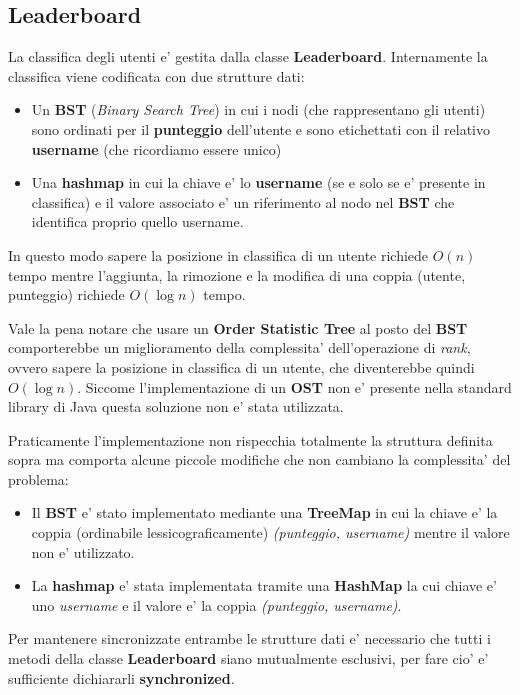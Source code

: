 \subsection{Leaderboard}

La classifica degli utenti e' gestita dalla classe \textbf{Leaderboard}. Internamente la classifica viene codificata con due strutture dati:
\begin{itemize}
	\item Un \textbf{BST} (\emph{Binary Search Tree}) in cui i nodi (che rappresentano gli utenti) sono ordinati per il \textbf{punteggio} dell'utente e sono etichettati con il relativo \textbf{username} (che ricordiamo essere unico)
	\item Una \textbf{hashmap} in cui la chiave e' lo \textbf{username} (se e solo se e' presente in classifica) e il valore associato e' un riferimento al nodo nel \textbf{BST} che identifica proprio quello username.
\end{itemize}
In questo modo sapere la posizione in classifica di un utente richiede $O(n)$ tempo mentre l'aggiunta, la rimozione e la modifica di una coppia (utente, punteggio) richiede $O(\log{n})$ tempo.

Vale la pena notare che usare un \textbf{Order Statistic Tree} al posto del \textbf{BST} comporterebbe un miglioramento della complessita' dell'operazione di \emph{rank}, ovvero sapere la posizione in classifica di un utente, che diventerebbe quindi $O(\log{n})$. Siccome l'implementazione di un \textbf{OST} non e' presente nella standard library di Java questa soluzione non e' stata utilizzata.

Praticamente l'implementazione non rispecchia totalmente la struttura definita sopra ma comporta alcune piccole modifiche che non cambiano la complessita' del problema:
\begin{itemize}
	\item Il \textbf{BST} e' stato implementato mediante una \textbf{TreeMap} in cui la chiave e' la coppia (ordinabile lessicograficamente) \emph{(punteggio, username)} mentre il valore non e' utilizzato.
	\item La \textbf{hashmap} e' stata implementata tramite una \textbf{HashMap} la cui chiave e' uno \emph{username} e il valore e' la coppia \emph{(punteggio, username)}.
\end{itemize}
Per mantenere sincronizzate entrambe le strutture dati e' necessario che tutti i metodi della classe \textbf{Leaderboard} siano mutualmente esclusivi, per fare cio' e' sufficiente dichiararli \textbf{synchronized}.

